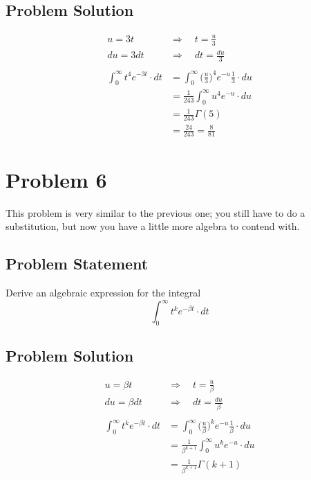 \documentclass[12pt]{article}
\theoremstyle{definition}
\begin{document}
\subsection*{Problem Solution}
\begin{align*}
u = 3t \quad&\Rightarrow\quad t = \frac{u}{3}\\
du = 3dt \quad&\Rightarrow\quad dt = \frac{du}{3}\\\\
\int_0^\infty t^4 e^{-3t} \cdot dt &= \int_0^\infty \biggr(\frac{u}{3}\biggr)^4 e^{-u} \frac{1}{3}\cdot du\\
&= \frac{1}{243}\int_0^\infty u^4 e^{-u}\cdot du\\
&= \frac{1}{243} \Gamma(5)\\
& = \frac{24}{243} = \frac{8}{81}
\end{align*}




\newpage
\section*{Problem 6}

This problem is very similar to the previous one; you still have to do a substitution, but now you have a little more algebra to contend with.

\subsection*{Problem Statement}

Derive an algebraic expression for the integral
$$
\int_0^\infty t^k e^{-\beta t} \cdot dt
$$

\subsection*{Problem Solution}
\begin{align*}
u = \beta t \quad&\Rightarrow\quad t = \frac{u}{\beta}\\
du = \beta dt \quad&\Rightarrow\quad dt = \frac{du}{\beta}\\\\
\int_0^\infty t^k e^{-\beta t} \cdot dt &= \int_0^\infty \biggr(\frac{u}{\beta}\biggr)^k e^{-u} \frac{1}{\beta}\cdot du\\
&= \frac{1}{\beta^{k + 1}}\int_0^\infty u^k e^{-u}\cdot du\\
&= \frac{1}{\beta^{k + 1}} \Gamma(k + 1)\\
\end{align*}
\end{document}
